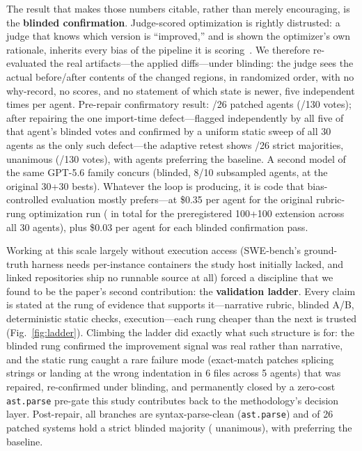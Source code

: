 \documentclass[11pt]{article}
\begin{document}
The result that makes those numbers citable, rather than merely encouraging,
is the \textbf{blinded confirmation}. Judge-scored optimization is rightly
distrusted: a judge that knows which version is ``improved,'' and is shown the
optimizer's own rationale, inherits every bias of the pipeline it is
scoring~\citep{llmjudge2023,selfpreference2024}. We therefore re-evaluated the
real artifacts---the applied diffs---under blinding: the judge sees the actual
before/after contents of the changed regions, in randomized order, with no
why-record, no scores, and no statement of which state is newer, five
independent times per agent. Pre-repair confirmatory result:
\swBlindPreMajP/26 patched agents (\swBlindPreVotesP/130 votes); after
repairing the one import-time defect---flagged independently by all five of
that agent's blinded votes and confirmed by a uniform static sweep of all 30
agents as the only such defect---the adaptive retest shows \swBlindMajP/26
strict majorities, \swBlindPerfect{} unanimous (\swBlindVotesP/130 votes),
with \swBlindMajB{} agents preferring the baseline. A second model
of the same GPT-5.6 family concurs (blinded, 8/10 subsampled agents, at the
original 30+30 bests).
Whatever the loop is producing, it is code that bias-controlled evaluation
mostly prefers---at \$0.35 per agent for the original rubric-rung
optimization run (\swPhaseBTotal{} in total for the preregistered 100+100
extension across all 30 agents), plus \$0.03 per agent for each blinded
confirmation pass.

Working at this scale largely without execution access (SWE-bench's
ground-truth harness needs per-instance containers the study host initially
lacked, and \swNoSource{} linked repositories ship no runnable source at all)
forced a discipline that we found to be the paper's second contribution: the
\textbf{validation ladder}. Every claim is stated at the rung of evidence that
supports it---narrative rubric, blinded A/B, deterministic static checks,
execution---each rung cheaper than the next is trusted
(Fig.~\ref{fig:ladder}). Climbing the ladder did exactly what such structure
is for: the blinded rung confirmed the improvement signal was real rather than
narrative, and the static rung caught a rare failure mode (exact-match patches
splicing strings or landing at the wrong indentation in 6 files across 5
agents) that was repaired, re-confirmed under blinding, and permanently closed
by a zero-cost \texttt{ast.parse} pre-gate this study contributes back to the
methodology's decision layer. Post-repair, all \swN{} branches are
syntax-parse-clean (\texttt{ast.parse}) and \swBlindMajP{} of 26 patched
systems hold a strict blinded majority (\swBlindPerfect{} unanimous), with
\swBlindMajB{} preferring the baseline.
\end{document}
